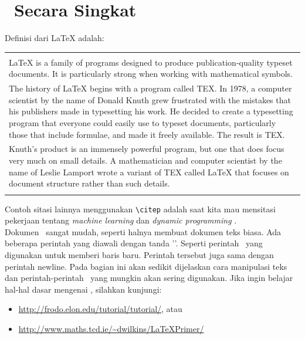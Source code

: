 \iffalse
\section{\latex~Secara Singkat}
Definisi dari LaTeX \citep{lankton2008introduction} adalah: \\ 
\begin{tabular}{| p{13cm} |}
	\hline 
	\\
	LaTeX is a family of programs designed to produce publication-quality 
	typeset documents. It is particularly strong when working with 
	mathematical symbols. \\	
	The history of LaTeX begins with a program called TEX. In 1978, a 
	computer scientist by the name of Donald Knuth grew frustrated with the 
	mistakes that his publishers made in typesetting his work. He decided 
	to create a typesetting program that everyone could easily use to 
	typeset documents, particularly those that include formulae, and made 
	it freely available. The result is TEX. \\	
	Knuth's product is an immensely powerful program, but one that does 
	focus very much on small details. A mathematician and computer 
	scientist by the name of Leslie Lamport wrote a variant of TEX called 
	LaTeX that focuses on document structure rather than such details. \\
	\\
	\hline
\end{tabular}

\vspace*{0.8cm}

Contoh sitasi lainnya menggunakan \verb|\citep| adalah saat kita mau mensitasi pekerjaan tentang \textit{machine learning} \citep{chin2000learning} dan \textit{dynamic programming} \citep{barto1995learning}. \\

Dokumen \latex~sangat mudah, seperti halnya membuat dokumen teks biasa. Ada 
beberapa perintah yang diawali dengan tanda '\bslash'. 
Seperti perintah \bslash\bslash~yang digunakan untuk memberi baris baru. 
Perintah tersebut juga sama dengan perintah \bslash newline. 
Pada bagian ini akan sedikit dijelaskan cara manipulasi teks dan 
perintah-perintah \latex~yang mungkin akan sering digunakan. 
Jika ingin belajar hal-hal dasar mengenai \latex, silahkan kunjungi: 

\begin{itemize}
	\item \url{http://frodo.elon.edu/tutorial/tutorial/}, atau
	\item \url{http://www.maths.tcd.ie/~dwilkins/LaTeXPrimer/}
\end{itemize}


